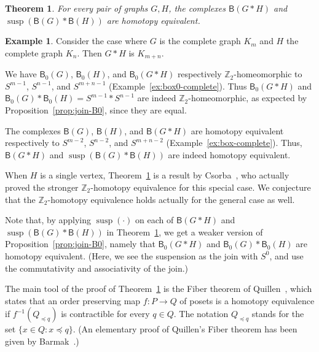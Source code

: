 \documentclass[12pt]{amsart}
\newtheorem{theorem}{Theorem}[section]
\theoremstyle{definition}
\newtheorem{example}{Example}
\def\Z{\mathbb{Z}}
\def\B{\mathsf{B}}
\renewcommand{\preceq}{\preccurlyeq}
\def\susp{\operatorname{susp}}
\begin{document}
\begin{theorem}\label{thm:join-B}
For every pair of graphs $G,H$, the complexes $\B(G * H)$ and ${\susp}{( \B(G) * \B(H))}$ are homotopy equivalent.
\end{theorem}

\begin{example}
    Consider the case where $G$ is the complete graph $K_m$ and $H$ the complete graph $K_n$. Then $G*H$ is $K_{m+n}$. 
    
    We have $\B_0(G)$, $\B_0(H)$, and $\B_0(G*H)$ respectively $\Z_2$-homeomorphic to $S^{m-1}$, $S^{n-1}$, and $S^{m+n-1}$ (Example~\ref{ex:box0-complete}). Thus $\B_0(G*H)$ and $\B_0(G)*\B_0(H)=S^{m-1}*S^{n-1}$ are indeed $\Z_2$-homeomorphic, as expected by Proposition~\ref{prop:join-B0}, since they are equal.

    The complexes $\B(G)$, $\B(H)$, and $\B(G*H)$ are homotopy equivalent respectively to $S^{m-2}$, $S^{n-2}$, and $S^{m+n-2}$ (Example~\ref{ex:box-complete}). Thus, $\B(G*H)$ and $\susp(\B(G)*\B(H))$ are indeed homotopy equivalent.
\end{example}

When $H$ is a single vertex, Theorem~\ref{thm:join-B} is a result by Csorba~\cite[Lemma 7.2]{csorba2007homotopy}, who actually proved the stronger $\Z_2$-homotopy equivalence for this special case. We conjecture that the $\Z_2$-homotopy equivalence holds actually for the general case as well.

Note that, by applying $\susp(\cdot)$ on each of $\B(G * H)$ and ${\susp}{( \B(G) * \B(H))}$ in Theorem~\ref{thm:join-B}, we get a weaker version of Proposition~\ref{prop:join-B0}, namely that $\B_0(G * H)$ and $\B_0(G) * \B_0(H)$ are homotopy equivalent. (Here, we see the suspension as the join with $S^0$, and use the commutativity and associativity of the join.)

The main tool of the proof of Theorem~\ref{thm:join-B} is the Fiber theorem of Quillen~\cite[Proposition 1.6]{quillen1978homotopy}, which states that an order preserving map $f \colon P\to Q$ of posets is a homotopy equivalence if $f^{-1}(Q_{\preceq q})$ is
contractible for every $q\in Q$. The notation $Q_{\preceq q}$ stands for the set $\{x\in Q\colon x\preceq q\}$. (An elementary proof of Quillen's Fiber theorem has been given by Barmak~\cite{barmak2011quillen}.)
\end{document}
